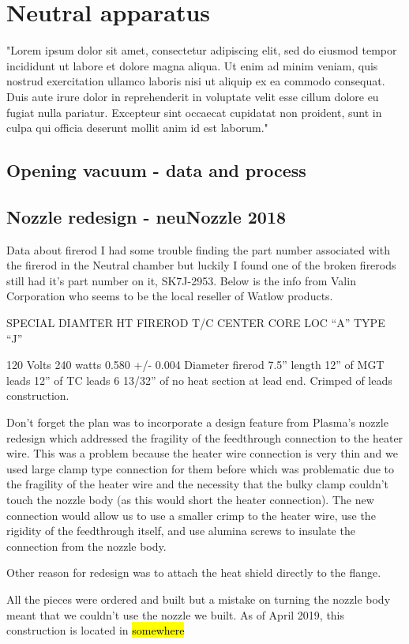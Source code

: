 \chapter{Neutral apparatus } \label{app:breakingVacuum}
"Lorem ipsum dolor sit amet, consectetur adipiscing elit, sed do eiusmod tempor incididunt ut labore et dolore magna aliqua. Ut enim ad minim veniam, quis nostrud exercitation ullamco laboris nisi ut aliquip ex ea commodo consequat. Duis aute irure dolor in reprehenderit in voluptate velit esse cillum dolore eu fugiat nulla pariatur. Excepteur sint occaecat cupidatat non proident, sunt in culpa qui officia deserunt mollit anim id est laborum."

\section{Opening vacuum - data and process}

\section{Nozzle redesign - neuNozzle 2018}


Data about firerod
I had some trouble finding the part number associated with the firerod in the Neutral chamber but luckily I found one of the broken firerods still had it's part number on it, SK7J-2953. 
Below is the info from Valin Corporation who seems to be the local reseller of Watlow products.

SPECIAL DIAMTER
HT FIREROD   
T/C CENTER CORE LOC “A” TYPE “J”
 
120 Volts
240 watts
0.580 +/- 0.004 Diameter firerod
7.5” length
12” of MGT leads
12” of TC leads
6 13/32” of no heat section at lead end.
Crimped of leads construction.

Don't forget the plan was to incorporate a design feature from Plasma's nozzle redesign which addressed the fragility of the feedthrough connection to the heater wire. This was a problem because the heater wire connection is very thin and we used large clamp type connection for them before which was problematic due to the fragility of the heater wire and the necessity that the bulky clamp couldn't touch the nozzle body (as this would short the heater connection). The new connection would allow us to use a smaller crimp to the heater wire, use the rigidity of the feedthrough itself, and use alumina screws to insulate the connection from the nozzle body.

Other reason for redesign was to attach the heat shield directly to the flange.

All the pieces were ordered and built but a mistake on turning the nozzle body meant that we couldn't use the nozzle we built. As of April 2019, this construction is located in \hl{somewhere}